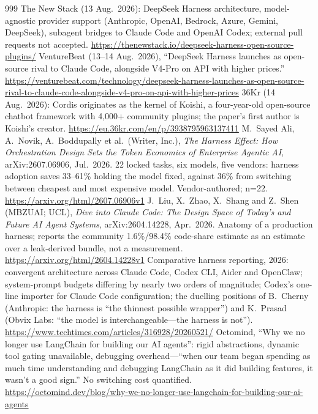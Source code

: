 \begin{thebibliography}{999}
 The New Stack (13 Aug.\ 2026): DeepSeek Harness architecture, model-agnostic provider support (Anthropic, OpenAI, Bedrock, Azure, Gemini, DeepSeek), subagent bridges to Claude Code and OpenAI Codex; external pull requests not accepted. \url{https://thenewstack.io/deepseek-harness-open-source-plugins/}
 VentureBeat (13--14 Aug.\ 2026), ``DeepSeek Harness launches as open-source rival to Claude Code, alongside V4-Pro on API with higher prices.'' \url{https://venturebeat.com/technology/deepseek-harness-launches-as-open-source-rival-to-claude-code-alongside-v4-pro-on-api-with-higher-prices}
 36Kr (14 Aug.\ 2026): Cordis originates as the kernel of Koishi, a four-year-old open-source chatbot framework with 4,000+ community plugins; the paper's first author is Koishi's creator. \url{https://eu.36kr.com/en/p/3938795963137411}
 M.~Sayed Ali, A.~Novik, A.~Boddupally et al.\ (Writer, Inc.), \emph{The Harness Effect: How Orchestration Design Sets the Token Economics of Enterprise Agentic AI}, arXiv:2607.06906, Jul.\ 2026. 22 locked tasks, six models, five vendors: harness adoption saves 33--61\% holding the model fixed, against 36\% from switching between cheapest and most expensive model. Vendor-authored; n=22. \url{https://arxiv.org/html/2607.06906v1}
 J.~Liu, X.~Zhao, X.~Shang and Z.~Shen (MBZUAI; UCL), \emph{Dive into Claude Code: The Design Space of Today's and Future AI Agent Systems}, arXiv:2604.14228, Apr.\ 2026. Anatomy of a production harness; reports the community 1.6\%/98.4\% code-share estimate as an estimate over a leak-derived bundle, not a measurement. \url{https://arxiv.org/html/2604.14228v1}
 Comparative harness reporting, 2026: convergent architecture across Claude Code, Codex CLI, Aider and OpenClaw; system-prompt budgets differing by nearly two orders of magnitude; Codex's one-line importer for Claude Code configuration; the duelling positions of B.~Cherny (Anthropic: the harness is ``the thinnest possible wrapper'') and K.~Prasad (Obvix Labs: ``the model is interchangeable---the harness is not''). \url{https://www.techtimes.com/articles/316928/20260521/}
 Octomind, ``Why we no longer use LangChain for building our AI agents'': rigid abstractions, dynamic tool gating unavailable, debugging overhead---``when our team began spending as much time understanding and debugging LangChain as it did building features, it wasn't a good sign.'' No switching cost quantified. \url{https://octomind.dev/blog/why-we-no-longer-use-langchain-for-building-our-ai-agents}

\end{thebibliography}
